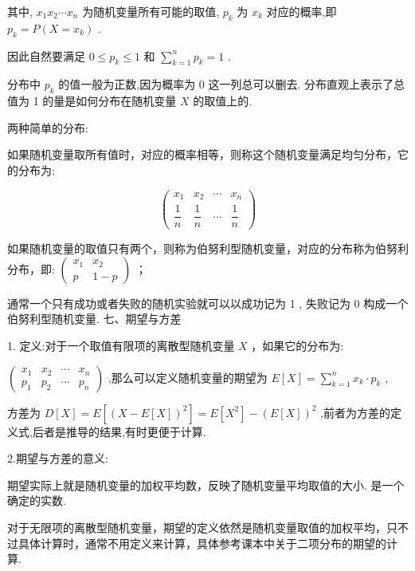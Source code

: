 其中, ${x}_{1}{x}_{2}\cdots {x}_{n}$ 为随机变量所有可能的取值, ${p}_{k}$ 为 ${x}_{k}$ 对应的概率,即 ${p}_{k} = P\left( {X = {x}_{k}}\right)$ .

因此自然要满足 $0 \leq  {p}_{k} \leq  1$ 和 $\mathop{\sum }\limits_{{k = 1}}^{n}{p}_{k} = 1$ .

分布中 ${p}_{k}$ 的值一般为正数,因为概率为 0 这一列总可以删去. 分布直观上表示了总值为 1 的量是如何分布在随机变量 $X$ 的取值上的.

两种简单的分布:

  如果随机变量取所有值时，对应的概率相等，则称这个随机变量满足均匀分布，它的分布为:

\[
\left( \begin{matrix} {x}_{1} & {x}_{2} & \cdots & {x}_{n} \\  \dfrac{1}{n} & \dfrac{1}{n} & \cdots & \dfrac{1}{n} \end{matrix}\right)
\]

  如果随机变量的取值只有两个，则称为伯努利型随机变量，对应的分布称为伯努利分布，即: $\left( \begin{matrix} {x}_{1} & {x}_{2} \\  p & 1 - p \end{matrix}\right)$ ；

通常一个只有成功或者失败的随机实验就可以以成功记为 1 , 失败记为 0 构成一个伯努利型随机变量. 七、期望与方差

1. 定义:对于一个取值有限项的离散型随机变量 $X$ ，如果它的分布为:

$\left( \begin{array}{llll} {x}_{1} & {x}_{2} & \cdots & {x}_{n} \\  {p}_{1} & {p}_{2} & \cdots & {p}_{n} \end{array}\right)$ ,那么可以定义随机变量的期望为 $E\left\lbrack  X\right\rbrack   = \mathop{\sum }\limits_{{k = 1}}^{n}{x}_{k} \cdot  {p}_{k}$ ,

方差为 $D\left\lbrack  X\right\rbrack   = E\left\lbrack  {\left( X - E\left\lbrack  X\right\rbrack  \right) }^{2}\right\rbrack   = E\left\lbrack  {X}^{2}\right\rbrack   - {\left( E\left\lbrack  X\right\rbrack  \right) }^{2}$ ,前者为方差的定义式,后者是推导的结果,有时更便于计算.

2.期望与方差的意义:

  期望实际上就是随机变量的加权平均数，反映了随机变量平均取值的大小. 是一个确定的实数.

  对于无限项的离散型随机变量，期望的定义依然是随机变量取值的加权平均，只不过具体计算时，通常不用定义来计算，具体参考课本中关于二项分布的期望的计算.

